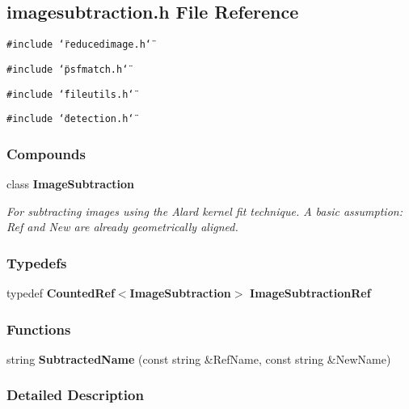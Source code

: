 \subsection{imagesubtraction.h File Reference}
\label{imagesubtraction_h}
{\tt \#include \char`\"{}reducedimage.h\char`\"{}}\par
{\tt \#include \char`\"{}psfmatch.h\char`\"{}}\par
{\tt \#include \char`\"{}fileutils.h\char`\"{}}\par
{\tt \#include \char`\"{}detection.h\char`\"{}}\par
\subsubsection*{Compounds}
\begin{CompactItemize}
\item 
class {\bf Image\-Subtraction}
\begin{CompactList}\small\item\em For subtracting images using the Alard kernel fit technique. A basic assumption: Ref and New are already geometrically aligned.\item\end{CompactList}\end{CompactItemize}
\subsubsection*{Typedefs}
\begin{CompactItemize}
\item 
{}
typedef {\bf Counted\-Ref}$<${\bf Image\-Subtraction}$>$ {\bf Image\-Subtraction\-Ref}\label{imagesubtraction_h_a0}

\end{CompactItemize}
\subsubsection*{Functions}
\begin{CompactItemize}
\item 
{}
string {\bf Subtracted\-Name} (const string \&Ref\-Name, const string \&New\-Name)\label{imagesubtraction_h_a1}

\end{CompactItemize}


\subsubsection{Detailed Description}


